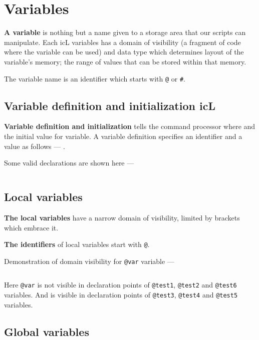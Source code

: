 \section{Variables}

\textbf{A variable} is nothing but a name given to a storage area that our scripts can manipulate. Each icL variables has a domain of visibility (a fragment of code where the variable can be used) and data type which determines layout of the variable's memory; the range of values that can be stored within that memory.

The variable name is an identifier which starts with \texttt{@} or \texttt{#}.

\subsection{Variable definition and initialization icL}

\textbf{Variable definition and initialization} tells the command processor where and the initial value for variable. A variable definition specifies an identifier and a value as follows —
.

Some valid declarations are shown here —
\inputminted[linenos]{icl}{../sources/initexample.icL}

\subsection{Local variables}

\textbf{The local variables} have a narrow domain of visibility, limited by brackets which embrace it.

{\bf The identifiers} of local variables start with \texttt{@}.

Demonstration of domain visibility for \texttt{@var} variable —
\inputminted[linenos]{icl}{../sources/localvars.icL}

Here \texttt{@var} is not visible in declaration points of \texttt{@test1}, \texttt{@test2} and \texttt{@test6} variables. And is visible in declaration points of \texttt{@test3}, \texttt{@test4} and \texttt{@test5} variables.

\subsection{Global variables}


